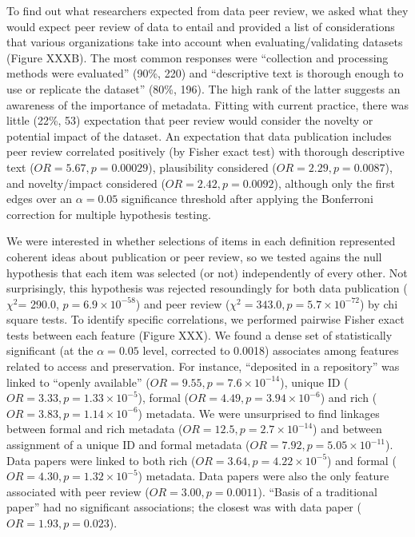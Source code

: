 \documentclass[10pt]{article}
\begin{document}
To find out what researchers expected from data peer review, we asked what they would expect peer review of data to entail and provided a list of considerations that various organizations take into account when evaluating/validating datasets (Figure XXXB).
The most common responses were ``collection and processing methods were evaluated'' (90\%, 220) and ``descriptive text is thorough enough to use or replicate the dataset'' (80\%, 196).
The high rank of the latter suggests an awareness of the importance of metadata.
Fitting with current practice, there was little (22\%, 53) expectation that peer review would consider the novelty or potential impact of the dataset.
An expectation that data publication includes peer review correlated positively (by Fisher exact test) with thorough descriptive text ($OR= 5.67, p= 0.00029$), plausibility considered ($OR= 2.29, p= 0.0087$), and novelty/impact considered ($OR= 2.42, p= 0.0092$), although only the first edges over an $\alpha= 0.05$ significance threshold after applying the Bonferroni correction for multiple hypothesis testing.

We were interested in whether selections of items in each definition represented coherent ideas about publication or peer review, so we tested agains the null hypothesis that each item was selected (or not) independently of every other.
Not surprisingly, this hypothesis was rejected resoundingly for both data publication ($\chi^{2}$= 290.0, $p= 6.9\times10^{-58}$) and peer review ($\chi^{2}= 343.0, p= 5.7\times10^{-72}$) by chi square tests.
To identify specific correlations, we performed pairwise Fisher exact tests between each feature (Figure XXX).
We found a dense set of statistically significant (at the $\alpha= 0.05$ level, corrected to 0.0018) associates among features related to access and preservation.
For instance, ``deposited in a repository'' was linked to ``openly available'' ($OR=9.55, p= 7.6\times10^{-14}$), unique ID ($OR= 3.33, p= 1.33\times10^{-5}$), formal ($OR= 4.49, p= 3.94\times10^{-6}$) and rich ($OR= 3.83, p=1.14\times10^{-6}$) metadata.
We were unsurprised to find linkages between formal and rich metadata ($OR= 12.5, p= 2.7\times10^{-14}$) and between assignment of a unique ID and formal metadata ($OR= 7.92, p= 5.05\times10^{-11}$).
Data papers were linked to both rich ($OR=3.64, p=4.22\times10^{-5}$) and formal ($OR=4.30, p=1.32\times10^{-5}$) metadata.
Data papers were also the only feature associated with peer review ($OR=3.00, p=0.0011$).
``Basis of a traditional paper'' had no significant associations; the closest was with data paper ($OR=1.93, p=0.023$).
\end{document}
